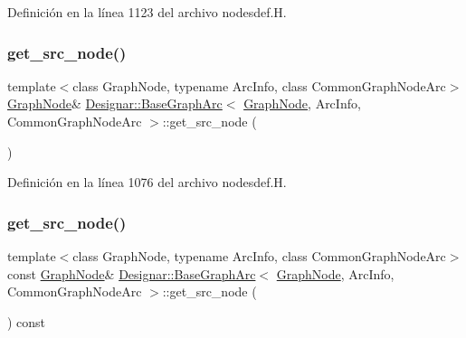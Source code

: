 Definición en la línea 1123 del archivo nodesdef.\+H.

\mbox{\label{class_designar_1_1_base_graph_arc_ae5bf587f363169ac3cf0de8808410476}} 
\subsubsection{\texorpdfstring{get\+\_\+src\+\_\+node()}{get\_src\_node()}\hspace{0.1cm}{\footnotesize\ttfamily [1/2]}}
{\footnotesize\ttfamily template$<$class Graph\+Node, typename Arc\+Info, class Common\+Graph\+Node\+Arc$>$ \\
\hyperlink{class_designar_1_1_graph_node}{Graph\+Node}\& \hyperlink{class_designar_1_1_base_graph_arc}{Designar\+::\+Base\+Graph\+Arc}$<$ \hyperlink{class_designar_1_1_graph_node}{Graph\+Node}, Arc\+Info, Common\+Graph\+Node\+Arc $>$\+::get\+\_\+src\+\_\+node (\begin{DoxyParamCaption}{ }\end{DoxyParamCaption})\hspace{0.3cm}{\ttfamily [inline]}}



Definición en la línea 1076 del archivo nodesdef.\+H.

\mbox{\label{class_designar_1_1_base_graph_arc_abf7c4174301f972969bc11e9154a353a}} 
\subsubsection{\texorpdfstring{get\+\_\+src\+\_\+node()}{get\_src\_node()}\hspace{0.1cm}{\footnotesize\ttfamily [2/2]}}
{\footnotesize\ttfamily template$<$class Graph\+Node, typename Arc\+Info, class Common\+Graph\+Node\+Arc$>$ \\
const \hyperlink{class_designar_1_1_graph_node}{Graph\+Node}\& \hyperlink{class_designar_1_1_base_graph_arc}{Designar\+::\+Base\+Graph\+Arc}$<$ \hyperlink{class_designar_1_1_graph_node}{Graph\+Node}, Arc\+Info, Common\+Graph\+Node\+Arc $>$\+::get\+\_\+src\+\_\+node (\begin{DoxyParamCaption}{ }\end{DoxyParamCaption}) const\hspace{0.3cm}{\ttfamily [inline]}}




